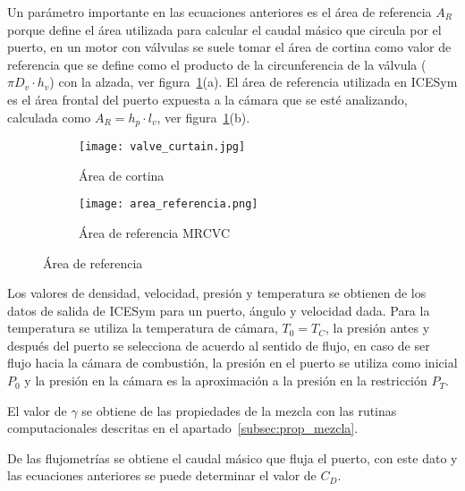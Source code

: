 Un parámetro importante en las ecuaciones anteriores es el área de referencia
$A_{R}$ porque define el área utilizada para calcular el caudal másico que
circula por el puerto, en un motor con válvulas se suele tomar el área de
cortina como valor de referencia que se define como el producto de la
circunferencia de la válvula ($\pi D_{v} \cdot h_{v}$) con la alzada, ver
figura~\ref{fig:area_referencia}(a).
%
El área de referencia utilizada en ICESym es el área frontal del puerto expuesta
a la cámara que se esté analizando, calculada como $A_{R} = h_{p} \cdot l_{v}$, ver
figura~\ref{fig:area_referencia}(b).

%

\begin{figure}
    \centering
    \begin{subfigure}{0.5\textwidth}
      \centering
      \texttt{[image: valve\_curtain.jpg]}
      \caption{Área de cortina}
    \end{subfigure}%
    \begin{subfigure}{0.5\textwidth}
      \centering
      \texttt{[image: area\_referencia.png]}
      \caption{Área de referencia MRCVC}
    \end{subfigure}
    \caption{Área de referencia}\label{fig:area_referencia}
\end{figure}

Los valores de densidad, velocidad, presión y temperatura se obtienen de los
datos de salida de ICESym para un puerto, ángulo y velocidad dada.
%
Para la temperatura se utiliza la temperatura de cámara, $T_0 = T_C$, la
presión antes y después del puerto se selecciona de acuerdo al sentido de
flujo, en caso de ser flujo hacia la cámara de combustión, la presión en el
puerto se utiliza como inicial $P_0$ y la presión en la cámara es la
aproximación a la presión en la restricción $P_T$.

El valor de $\gamma$ se obtiene de las propiedades de la mezcla con las rutinas
computacionales descritas en el apartado~\ref{subsec:prop_mezcla}.

De las flujometrías se obtiene el caudal másico que fluja el puerto, con este
dato y las ecuaciones anteriores se puede determinar el valor de $C_{D}$.

